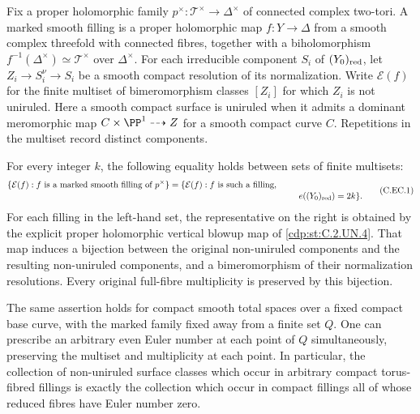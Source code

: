 
\begin{proposition}\label{cdp:st:C.2.UN.14}
Fix a proper holomorphic family $p^\times:\mathcal T^\times\to\Delta^\times$
of connected complex two-tori. A marked smooth filling is a proper
holomorphic map $f:Y\to\Delta$ from a smooth complex threefold with
connected fibres, together with a biholomorphism
$f^{-1}(\Delta^\times)\simeq\mathcal T^\times$ over $\Delta^\times$.
For each irreducible component $S_i$ of $(Y_0)_{\rm red}$, let
$Z_i\to S_i^\nu\to S_i$ be a smooth compact resolution of its
normalization. Write $\mathcal E(f)$ for the finite multiset of
bimeromorphism classes $[Z_i]$ for which $Z_i$ is not uniruled.
Here a smooth compact surface is uniruled when it admits a dominant
meromorphic map $C\times\PP^1\dashrightarrow Z$ for a smooth compact
curve $C$. Repetitions in the multiset record distinct components.

For every integer $k$, the following equality holds between sets of
finite multisets:
\[
 \begin{split}
 \{\mathcal E(f): f\text{ is a marked smooth filling of }p^\times\}
 ={}&\{\mathcal E(f): f\text{ is such a filling},\\[-2pt]
 &\hspace{48mm}e((Y_0)_{\rm red})=2k\}.
 \end{split}                                                     \tag{C.EC.1}\label{cdp:eq:C.EC.1}
\]
For each filling in the left-hand set, the representative on the
right is obtained by the explicit proper holomorphic vertical
blowup map of \ref{cdp:st:C.2.UN.4}. That map induces a bijection between the
original non-uniruled components and the resulting non-uniruled
components, and a bimeromorphism of their normalization resolutions.
Every original full-fibre multiplicity is preserved by this bijection.

The same assertion holds for compact smooth total spaces over a
fixed compact base curve, with the marked family fixed away from a
finite set $Q$. One can prescribe an arbitrary even Euler number at
each point of $Q$ simultaneously, preserving the multiset and
multiplicity at each point. In particular, the collection of
non-uniruled surface classes which occur in arbitrary compact
torus-fibred fillings is exactly the collection which occur in
compact fillings all of whose reduced fibres have Euler number zero.
\end{proposition}
